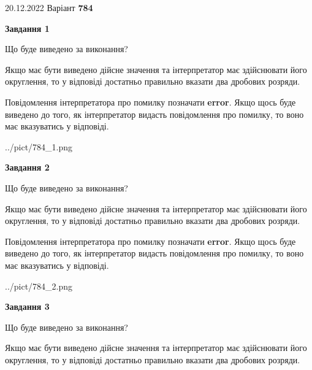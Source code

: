 \documentclass[12pt, ukrainian]{article}
\begin{document}
{20.12.2022 Варіант \No \textbf { 784 }\par}
{
\begin {Large}

{\begin {center}\textbf{Завдання 1}\end {center}}\par
Що буде виведено за виконання? \par

Якщо має бути виведено дійсне значення та інтерпретатор має здійснювати його округлення, 
то у відповіді достатньо правильно вказати два дробових розряди.

Повідомлення інтерпретатора про помилку позначати \textbf{error}.
Якщо щось буде виведено до того, як інтерпретатор видасть повідомлення про помилку, 
то воно має вказуватись у відповіді. \par

\begin{center}
	{../pict/784_1.png}
\end{center}
\newpage

{\begin {center}\textbf{Завдання 2}\end {center}}\par
Що буде виведено за виконання? \par

Якщо має бути виведено дійсне значення та інтерпретатор має здійснювати його округлення, 
то у відповіді достатньо правильно вказати два дробових розряди.

Повідомлення інтерпретатора про помилку позначати \textbf{error}.
Якщо щось буде виведено до того, як інтерпретатор видасть повідомлення про помилку, 
то воно має вказуватись у відповіді. \par

\begin{center}
	{../pict/784_2.png}
\end{center}
\newpage

{\begin {center}\textbf{Завдання 3}\end {center}}\par
Що буде виведено за виконання? \par

Якщо має бути виведено дійсне значення та інтерпретатор має здійснювати його округлення, 
то у відповіді достатньо правильно вказати два дробових розряди.


\end{Large}}
\end{document}

